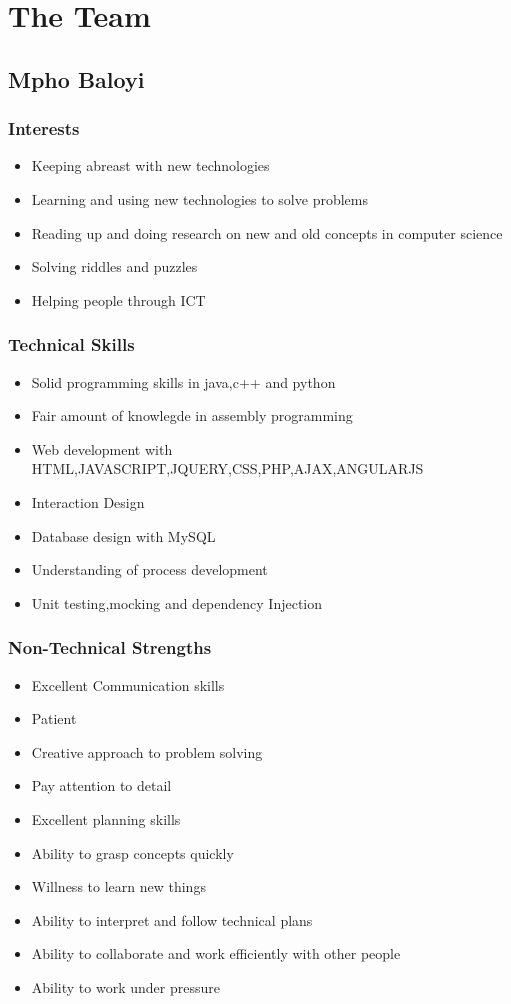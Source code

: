 \documentclass[a4paper,12pt]{article}
\begin{document}
\newpage
\newpage
\tableofcontents
\section{The Team}
\subsection{Mpho Baloyi}
\subsubsection{Interests}
\begin{itemize}
\item Keeping abreast with new technologies
\item Learning and using new technologies to solve problems
\item Reading up and doing research on new and old concepts in computer science
\item Solving riddles and puzzles
\item Helping people through ICT
\end{itemize}
\subsubsection{Technical Skills}
\begin{itemize}
\item Solid programming skills in java,c++ and python
\item Fair amount of knowlegde in assembly programming
\item Web development with HTML,JAVASCRIPT,JQUERY,CSS,PHP,AJAX,ANGULARJS
\item Interaction Design
\item Database design with MySQL
\item Understanding of process development
\item Unit testing,mocking and dependency Injection
\end{itemize}
\subsubsection{Non-Technical Strengths}
\begin{itemize}
\item Excellent Communication skills
\item Patient
\item Creative approach to problem solving
\item Pay attention to detail
\item Excellent planning skills
\item Ability to grasp concepts quickly
\item Willness to learn new things
\item Ability to interpret and follow technical plans
\item Ability to collaborate and work efficiently with other people
\item Ability to work under pressure
\end{itemize}
\end{document}
